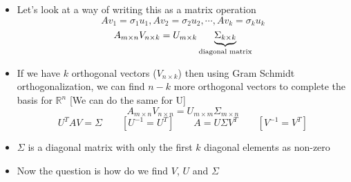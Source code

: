 \begin{frame}
  \begin{overlayarea}{\textwidth}{\textheight}
    \begin{itemize}\justifying
      \item<1-> Let's look at a way of writing this as a matrix operation
            \begin{equation*}
              Av_1 = \sigma_1u_1, Av_2 = \sigma_2u_2,\cdots,Av_k = \sigma_k u_k
            \end{equation*}
            \begin{equation*}
              A_{m \times n} V_{n \times k} = U_{m \times k} \underbrace{\Sigma_{k \times k}}_{\textnormal{diagonal matrix}}
            \end{equation*}
      \item<2-> If we have $k$ orthogonal vectors ($V_{n \times k}$) then using Gram Schmidt orthogonalization, we can find $n-k$ more orthogonal vectors to complete the basis for $\mathbb{R}^n$ [We can do the same for U]
            \begin{equation*}
              A_{m \times n} V_{n \times n} = U_{m \times m} \Sigma_{m \times n}
            \end{equation*}
            \begin{equation*}
              U^T AV = \Sigma \qquad [U^{-1}=U^T] \qquad A = U\Sigma V^T \qquad [V^{-1}=V^T]
            \end{equation*}
      \item<3-> $\Sigma$ is a diagonal matrix with only the first $k$ diagonal elements as non-zero
      \item<4-> Now the question is how do we find $V$, $U$ and $\Sigma$
    \end{itemize}
  \end{overlayarea}
\end{frame}

